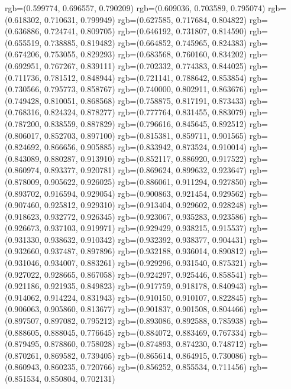 {{{					rgb=(0.599774, 0.696557, 0.790209)
					rgb=(0.609036, 0.703589, 0.795074)
					rgb=(0.618302, 0.710631, 0.799949)
					rgb=(0.627585, 0.717684, 0.804822)
					rgb=(0.636886, 0.724741, 0.809705)
					rgb=(0.646192, 0.731807, 0.814590)
					rgb=(0.655519, 0.738885, 0.819482)
					rgb=(0.664852, 0.745965, 0.824383)
					rgb=(0.674206, 0.753055, 0.829293)
					rgb=(0.683568, 0.760160, 0.834202)
					rgb=(0.692951, 0.767267, 0.839111)
					rgb=(0.702332, 0.774383, 0.844025)
					rgb=(0.711736, 0.781512, 0.848944)
					rgb=(0.721141, 0.788642, 0.853854)
					rgb=(0.730566, 0.795773, 0.858767)
					rgb=(0.740000, 0.802911, 0.863676)
					rgb=(0.749428, 0.810051, 0.868568)
					rgb=(0.758875, 0.817191, 0.873433)
					rgb=(0.768316, 0.824324, 0.878277)
					rgb=(0.777764, 0.831455, 0.883079)
					rgb=(0.787200, 0.838559, 0.887829)
					rgb=(0.796616, 0.845645, 0.892512)
					rgb=(0.806017, 0.852703, 0.897100)
					rgb=(0.815381, 0.859711, 0.901565)
					rgb=(0.824692, 0.866656, 0.905885)
					rgb=(0.833942, 0.873524, 0.910014)
					rgb=(0.843089, 0.880287, 0.913910)
					rgb=(0.852117, 0.886920, 0.917522)
					rgb=(0.860974, 0.893377, 0.920781)
					rgb=(0.869624, 0.899632, 0.923647)
					rgb=(0.878009, 0.905622, 0.926025)
					rgb=(0.886061, 0.911294, 0.927850)
					rgb=(0.893702, 0.916594, 0.929054)
					rgb=(0.900863, 0.921454, 0.929562)
					rgb=(0.907460, 0.925812, 0.929310)
					rgb=(0.913404, 0.929602, 0.928248)
					rgb=(0.918623, 0.932772, 0.926345)
					rgb=(0.923067, 0.935283, 0.923586)
					rgb=(0.926673, 0.937103, 0.919971)
					rgb=(0.929429, 0.938215, 0.915537)
					rgb=(0.931330, 0.938632, 0.910342)
					rgb=(0.932392, 0.938377, 0.904431)
					rgb=(0.932660, 0.937487, 0.897896)
					rgb=(0.932188, 0.936014, 0.890812)
					rgb=(0.931046, 0.934007, 0.883261)
					rgb=(0.929296, 0.931540, 0.875321)
					rgb=(0.927022, 0.928665, 0.867058)
					rgb=(0.924297, 0.925446, 0.858541)
					rgb=(0.921186, 0.921935, 0.849823)
					rgb=(0.917759, 0.918178, 0.840943)
					rgb=(0.914062, 0.914224, 0.831943)
					rgb=(0.910150, 0.910107, 0.822845)
					rgb=(0.906063, 0.905860, 0.813677)
					rgb=(0.901837, 0.901508, 0.804466)
					rgb=(0.897507, 0.897082, 0.795212)
					rgb=(0.893086, 0.892588, 0.785938)
					rgb=(0.888605, 0.888045, 0.776645)
					rgb=(0.884072, 0.883469, 0.767334)
					rgb=(0.879495, 0.878860, 0.758028)
					rgb=(0.874893, 0.874230, 0.748712)
					rgb=(0.870261, 0.869582, 0.739405)
					rgb=(0.865614, 0.864915, 0.730086)
					rgb=(0.860943, 0.860235, 0.720766)
					rgb=(0.856252, 0.855534, 0.711456)
					rgb=(0.851534, 0.850804, 0.702131)
}}}
